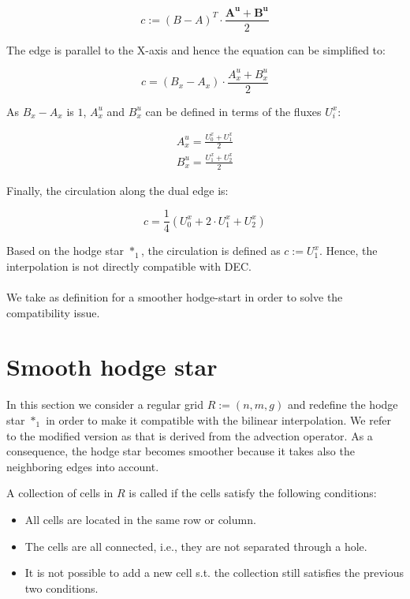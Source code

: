 \begin{equation}
c := ( B - A )^T \cdot \frac{\mathbf{A^u} + \mathbf{B^u}}{2}
\end{equation}

The edge is parallel to the X-axis and hence the equation can be simplified to:

\begin{equation}
c = ( B_x - A_x ) \cdot \frac{A^u_x + B^u_x}{2}
\end{equation}

As $B_x - A_x$ is $1$, $A^u_x$ and $B^u_x$ can be defined in terms of the fluxes $U_i^x$:

\begin{eqnarray}
A^u_x = \frac{U_0^x + U_1^x}{2} \\
B^u_x = \frac{U_1^x + U_2^x}{2}
\end{eqnarray}

Finally, the circulation along the dual edge is:

\begin{equation}
\label{eq:IntHodge}
c = \frac{1}{4}( U_0^x + 2 \cdot U_1^x + U_2^x )
\end{equation}

Based on the hodge star $*_1$, the circulation is defined as $c := U_1^x $.
Hence, the interpolation is not directly compatible with DEC.

\paragraph*{}
We take  as definition for a smoother hodge-start in order to solve the compatibility issue.








\section{Smooth hodge star}
\label{sec:SPDHodgeStar}
In this section we consider a regular grid $R:=(n,m,g)$ and redefine the hodge star $*_1$ in order to make it compatible with the bilinear interpolation.
We refer to the modified version as  that is derived from the advection operator.
As a consequence, the hodge star becomes smoother because it takes also the neighboring edges into account.

\begin{definition}[Component]
A collection of cells in $R$ is called  if the cells satisfy the following conditions:
\begin{itemize}
\item All cells are located in the same row or column.
\item The cells are all connected, i.e., they are not separated through a hole.
\item It is not possible to add a new cell s.t. the collection still satisfies the previous two conditions.
\end{itemize}
\end{definition}

